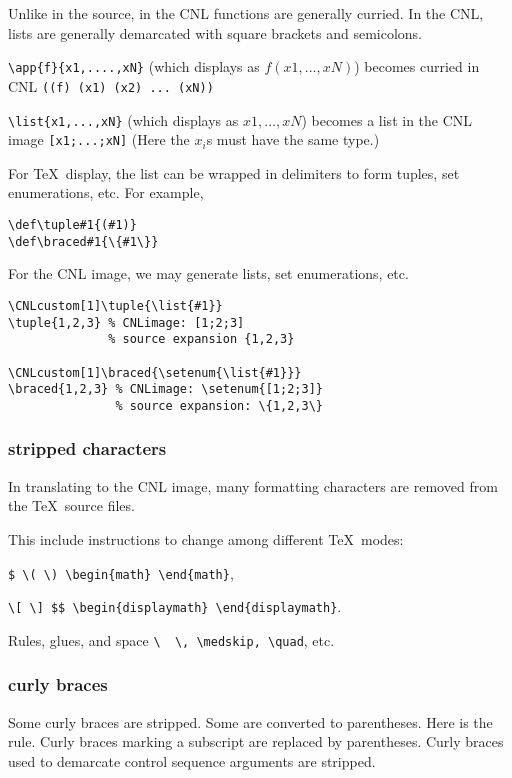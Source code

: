 \documentclass[12pt]{amsart}
\begin{document}
Unlike in the source, in the CNL functions are generally curried.
In the CNL, lists are generally demarcated with square brackets and semicolons.


\verb!\app{f}{x1,....,xN}! (which displays as $f(x1,...,xN)$) becomes curried in CNL \verb!((f) (x1) (x2) ... (xN))!

\verb!\list{x1,...,xN}! (which displays as $x1,\ldots,xN$)
becomes a list in the CNL image \verb![x1;...;xN]!  (Here the $x_i$s must have the same type.)

For \TeX\ display, the list can be wrapped in delimiters to form tuples, set enumerations, etc.
For example, 
\begin{Verbatim}
\def\tuple#1{(#1)}
\def\braced#1{\{#1\}}
\end{Verbatim}

For the CNL image, we may generate lists, set enumerations, etc. 
\begin{Verbatim}[fontfamily=tt,showspaces=false]
\CNLcustom[1]\tuple{\list{#1}}
\tuple{1,2,3} % CNLimage: [1;2;3]
              % source expansion {1,2,3}

\CNLcustom[1]\braced{\setenum{\list{#1}}} 
\braced{1,2,3} % CNLimage: \setenum{[1;2;3]}
               % source expansion: \{1,2,3\}
\end{Verbatim}


\subsubsection{stripped characters}

In translating to the CNL image, 
many formatting characters are removed from the \TeX\ source files.

This include instructions to change among different
\TeX\ modes:  

\verb!$ \( \) \begin{math} \end{math}!, 

\verb!\[ \] $$ \begin{displaymath} \end{displaymath}!.

Rules, glues, and space \verb!\  \, \medskip, \quad!, etc.

\subsubsection{curly braces}

Some curly braces are stripped.  Some are converted to
parentheses.  Here is the rule.  Curly braces marking a
subscript are replaced by parentheses.  Curly braces used
to demarcate control sequence arguments are stripped.
\end{document}
